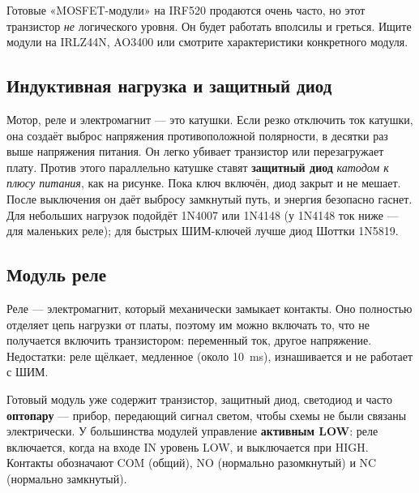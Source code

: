 
\begin{tip}
Готовые «MOSFET-модули» на IRF520 продаются очень часто, но этот транзистор \emph{не} логического уровня.
Он будет работать вполсилы и греться. Ищите модули на IRLZ44N, AO3400 или смотрите характеристики
конкретного модуля.
\end{tip}

\subsection{Индуктивная нагрузка и защитный диод}

Мотор, реле и электромагнит --- это катушки. Если резко отключить ток катушки, она создаёт выброс
напряжения противоположной полярности, в десятки раз выше напряжения питания. Он легко убивает
транзистор или перезагружает плату. Против этого параллельно катушке ставят \textbf{защитный диод}
\emph{катодом к плюсу питания}, как на рисунке. Пока ключ включён, диод закрыт и не мешает. После
выключения он даёт выбросу замкнутый путь, и энергия безопасно гаснет. Для небольших нагрузок
подойдёт 1N4007 или 1N4148 (у 1N4148 ток ниже --- для маленьких реле); для быстрых ШИМ-ключей лучше диод Шоттки 1N5819.

\subsection{Модуль реле}

Реле --- электромагнит, который механически замыкает контакты. Оно полностью отделяет цепь нагрузки от
платы, поэтому им можно включать то, что не получается включить транзистором: переменный ток, другое
напряжение. Недостатки: реле щёлкает, медленное (около \SI{10}{ms}), изнашивается и не работает с ШИМ.

Готовый модуль уже содержит транзистор, защитный диод, светодиод и часто \textbf{оптопару} --- прибор,
передающий сигнал светом, чтобы схемы не были связаны электрически. У большинства модулей управление
\textbf{активным LOW}: реле включается, когда на входе IN уровень LOW, и выключается при HIGH.
Контакты обозначают COM (общий), NO (нормально разомкнутый) и NC (нормально замкнутый).

